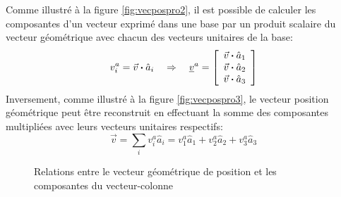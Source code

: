 Comme illustré à la figure \ref{fig:vecpospro2}, il est possible de calculer les composantes d'un vecteur exprimé dans une base par un produit scalaire du vecteur géométrique avec chacun des vecteurs unitaires de la base:
\begin{equation}
v_i^a = \vec{v} \boldsymbol{\cdot} \hat{a}_i  \quad \Rightarrow \quad 
\underline{v}^{a} = \left[ \begin{array}{c} \vec{v} \boldsymbol{\cdot} \hat{a}_1 \\ \vec{v} \boldsymbol{\cdot} \hat{a}_2 \\ \vec{v} \boldsymbol{\cdot} \hat{a}_3  \end{array} \right] 
\end{equation} 
Inversement, comme illustré à la figure \ref{fig:vecpospro3}, le vecteur position géométrique peut être reconstruit en effectuant la somme des composantes multipliées avec leurs vecteurs unitaires respectifs:
\begin{equation}
\vec{v} = \sum_{i} v_i^a \hat{a}_i = v_1^a \hat{a}_1 + v_2^a \hat{a}_2 + v_3^a \hat{a}_3%
\end{equation} 
\begin{figure}[H]
        \centering
				\hspace{+20pt}
        \caption{Relations entre le vecteur géométrique de position et les composantes du vecteur-colonne}
				\label{fig:vecpospro23}
\end{figure}


